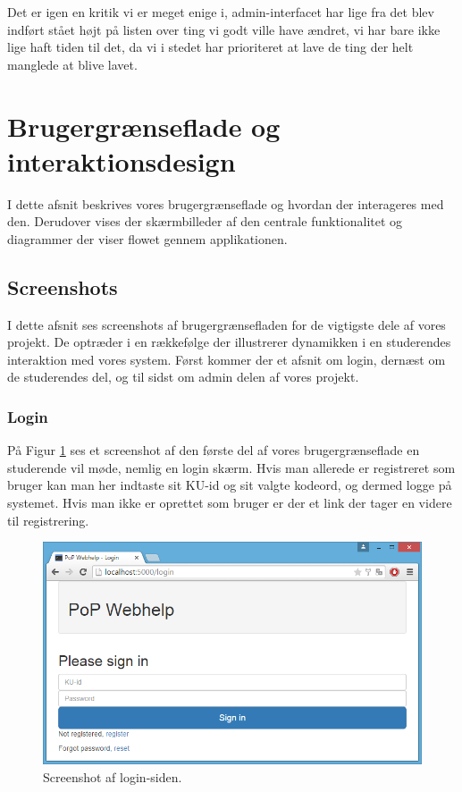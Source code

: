 \documentclass[11pt, a4paper]{article}
\begin{document}
Det er igen en kritik vi er meget enige i, admin-interfacet har lige fra det blev indført stået højt på listen over ting vi godt ville have ændret, vi har bare ikke lige haft tiden til det, da vi i stedet har prioriteret at lave de ting der helt manglede at blive lavet.

\section{Brugergrænseflade og interaktionsdesign}
\label{sec:userinterface}

I dette afsnit beskrives vores brugergrænseflade og hvordan der interageres med den. Derudover vises der skærmbilleder af den centrale funktionalitet og diagrammer der viser flowet gennem applikationen.

\subsection{Screenshots}
\label{sub:screenshots}
I dette afsnit ses screenshots af brugergrænsefladen for de vigtigste dele af vores projekt. De optræder i en rækkefølge der illustrerer dynamikken i en studerendes interaktion med vores system. Først kommer der et afsnit om login, dernæst om de studerendes del, og til sidst om admin delen af vores projekt.

\subsubsection{Login}
\label{subsub:screenshots_login}
På Figur \ref{fig:screenshot_login} ses et screenshot af den første del af vores brugergrænseflade en studerende vil møde, nemlig en login skærm. Hvis man allerede er registreret som bruger kan man her indtaste sit KU-id og sit valgte kodeord, og dermed logge på systemet. Hvis man ikke er oprettet som bruger er der et link der tager en videre til registrering.

\begin{figure}[htpb]
    \centering
    \includegraphics[width=1\linewidth]{figures/interface/login.png}
    \caption{Screenshot af login-siden.}
    \label{fig:screenshot_login}
\end{figure}
\end{document}
